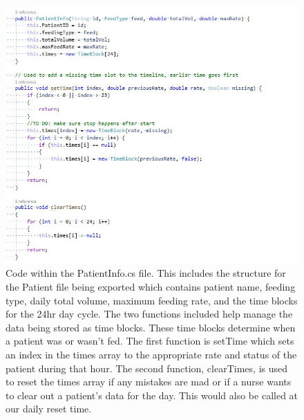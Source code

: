 \documentclass[onecolumn, draftclsnofoot,10pt, compsoc]{IEEEtran}
\begin{document}
\begin{figure}[htp]
    \centering
    \includegraphics[width=18cm]{code2}
    \caption{Code within the PatientInfo.cs file. This includes the structure for the Patient file being exported which contains patient name, feeding type, daily total volume, maximum feeding rate, and the time blocks for the 24hr day cycle. The two functions included help manage the data being stored as time blocks. These time blocks determine when a patient was or wasn't fed. The first function is setTime which sets an index in the times array to the appropriate rate and status of the patient during that hour. The second function, clearTimes, is used to reset the times array if any mistakes are mad or if a nurse wants to clear out a patient's data for the day. This would also be called at our daily reset time.}
    \label{fig:HoursData}
\end{figure}
\end{document}
